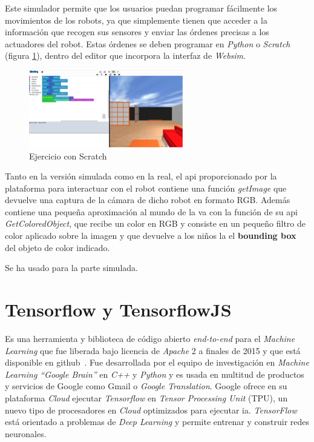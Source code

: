 Este simulador permite que los usuarios puedan programar fácilmente los movimientos de los robots, ya que simplemente tienen que acceder a la información que recogen sus sensores y enviar las órdenes precisas a los actuadores del robot. Estas órdenes se deben programar en \textit{Python} o \textit{Scratch} (figura \ref{fig:kibotics1}), dentro del editor que incorpora la interfaz de \textit{Websim}.
\begin{figure}[H]
  \begin{center}
    \includegraphics[width=0.6\textwidth]{figures/herramientas/kibotics1.png}
		\caption{Ejercicio con Scratch}
		\label{fig:kibotics1}
		\end{center}
\end{figure}
Tanto en la versión simulada como en la real, el \acrshort{api} proporcionado por la plataforma para interactuar con el robot contiene una función \textit{getImage} que devuelve una captura de la cámara de dicho robot en formato RGB. Además contiene una pequeña aproximación al mundo de la \acrfull{va} con la función de su \acrshort{api} \textit{GetColoredObject}, que recibe un color en RGB y consiste en un pequeño filtro de color aplicado sobre la imagen y que devuelve a los niños la el \textbf{bounding box} del objeto de color indicado.

Se ha usado para la parte simulada.

\section{Tensorflow y TensorflowJS}
Es una herramienta y biblioteca de código abierto \textit{end-to-end} para el \textit{Machine Learning} que fue liberada bajo licencia de \textit{Apache} 2 a finales de 2015 y que está disponible en github~\cite{github_tensorflow}. Fue desarrollada por el equipo de investigación en \textit{Machine Learning “Google Brain”}  en \textit{C++} y \textit{Python} y es usada en multitud de productos y servicios de Google como Gmail o \textit{Google Translation}. Google ofrece en su plataforma \textit{Cloud} ejecutar \textit{Tensorflow} en \textit{Tensor Processing Unit} (TPU), un nuevo tipo de procesadores en \textit{Cloud} optimizados para ejecutar \acrfull{ia}.  \textit{TensorFlow} está orientado a problemas de \textit{Deep Learning} y permite entrenar y construir redes neuronales. 

